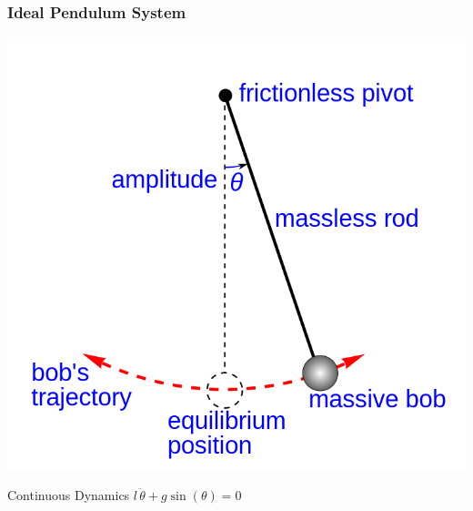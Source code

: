 \documentclass[12pt]{beamer}
\begin{document}
\begin{frame}
\frametitle{Ideal Pendulum System}

\begin{center}
\includegraphics[width=.4\linewidth]{Simple_gravity_pendulum.png}
\end{center}

\begin{block}{Continuous Dynamics}
\centering
$l \, \ddot\theta + g \sin(\theta) = 0$
\end{block}

\end{frame}
\end{document}
